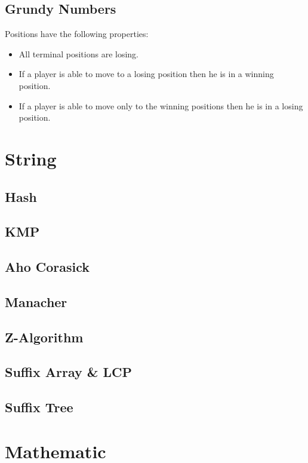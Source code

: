 \documentclass[10pt,a4paper]{report}
\begin{document}
	\section{Grundy Numbers}
		Positions have the following properties:
		\begin{itemize}
			\item All terminal positions are losing.
			\item If a player is able to move to a losing position then he is in a winning position.
			\item If a player is able to move only to the winning positions then he is in a losing position.
		\end{itemize}
		
\chapter{String}
	\section{Hash}
		
	\section{KMP}
		
	\section{Aho Corasick}
		
	\section{Manacher}
	\section{Z-Algorithm}
	\section{Suffix Array \& LCP}
		
	\section{Suffix Tree}
	
\chapter{Mathematic}
\end{document}
